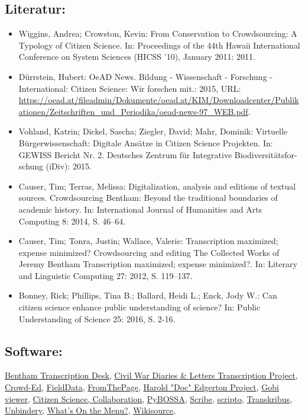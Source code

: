 \documentclass{article}
\begin{document}
        \subsection*{Literatur:}\begin{itemize}\item Wiggins, Andrea; Crowston, Kevin: From Conservation to Crowdsourcing: A Typology of Citizen Science. In: Proceedings of the 44th Hawaii International Conference on System Sciences (HICSS '10), January 2011: 2011.\item Dürrstein, Hubert: OeAD News. Bildung - Wissenschaft - Forschung - International: Citizen Science: Wir forschen mit.: 2015, URL: \url{https://oead.at/fileadmin/Dokumente/oead.at/KIM/Downloadcenter/Publikationen/Zeitschriften_und_Periodika/oead-news-97_WEB.pdf}.\item Vohland, Katrin; Dickel, Sascha; Ziegler, David; Mahr, Dominik: Virtuelle Bürgerwissenschaft: Digitale Ansätze in Citizen Science Projekten. In: GEWISS Bericht Nr. 2. Deutsches Zentrum für Integrative Biodiversitätsfor- schung (iDiv): 2015.\item Causer, Tim; Terras, Melissa: Digitalization, analysis and editions of textual sources. Crowdsourcing Bentham: Beyond the traditional boundaries of academic history. In: International Journal of Humanities and Arts Computing 8: 2014, S. 46–64.\item Causer, Tim; Tonra, Justin; Wallace, Valerie: Transcription maximized; expense minimized? Crowdsourcing and editing The Collected Works of Jeremy Bentham Transcription maximized; expense minimized?. In: Literary and Linguistic Computing 27: 2012, S. 119–137.\item Bonney, Rick; Phillips, Tina B.; Ballard, Heidi L.; Enck, Jody W.: Can citizen science enhance public understanding of science? In: Public Understanding of Science 25: 2016, S. 2-16.\end{itemize}\subsection*{Software:}\href{http://transcribe-bentham.ucl.ac.uk/td/Transcribe_Bentham}{Bentham Transcription Desk}, \href{https://diyhistory.lib.uiowa.edu}{Civil War Diaries & Letters Transcription Project}, \href{https://github.com/gsbodine/crowd-ed}{Crowd-Ed}, \href{http://www.ala.org.au/get-involved/citizen-science/fielddata-software/}{FieldData}, \href{https://fromthepage.com/}{FromThePage}, \href{http://edgerton-digital-collections.org/notebooks}{Harold "Doc" Edgerton Project}, \href{http://www.digiverso.com/de/products/viewer}{Gobi viewer}, \href{https://islandora.ca/}{Citizen Science, Collaboration}, \href{http://pybossa.com/}{PyBOSSA}, \href{http://github.com/zooniverse/Scribe}{Scribe}, \href{http://scripto.org/}{scripto}, \href{https://transkribus.eu/Transkribus/}{Transkribus}, \href{http://bencrowder.net/coding/unbindery/}{Unbindery}, \href{http://menus.nypl.org/}{What's On the Menu?}, \href{http://en.wikisource.org/wiki/Main_Page}{Wikisource}, 
\end{document}
